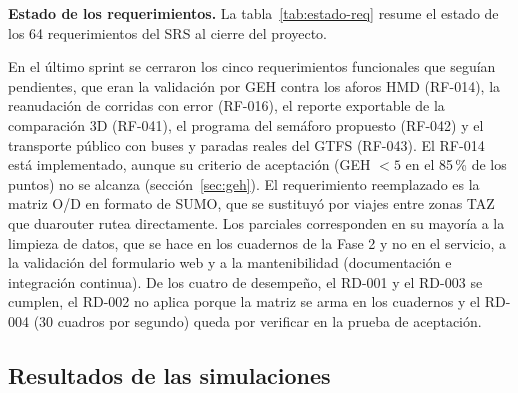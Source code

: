 \textbf{Estado de los requerimientos.} La tabla~\ref{tab:estado-req} resume el estado de los 64 requerimientos del SRS al cierre del proyecto.

\begin{table}[ht]
\renewcommand{\arraystretch}{1.15}
\centering
\small
{}
\caption{Estado de los requerimientos del SRS.}
\label{tab:estado-req}
\end{table}

En el último sprint se cerraron los cinco requerimientos funcionales que seguían pendientes, que eran la validación por GEH contra los aforos HMD (RF-014), la reanudación de corridas con error (RF-016), el reporte exportable de la comparación 3D (RF-041), el programa del semáforo propuesto (RF-042) y el transporte público con buses y paradas reales del GTFS (RF-043). El RF-014 está implementado, aunque su criterio de aceptación (GEH $<5$ en el 85\,\% de los puntos) no se alcanza (sección~\ref{sec:geh}). El requerimiento reemplazado es la matriz O/D en formato de SUMO, que se sustituyó por viajes entre zonas TAZ que duarouter rutea directamente. Los parciales corresponden en su mayoría a la limpieza de datos, que se hace en los cuadernos de la Fase 2 y no en el servicio, a la validación del formulario web y a la mantenibilidad (documentación e integración continua). De los cuatro de desempeño, el RD-001 y el RD-003 se cumplen, el RD-002 no aplica porque la matriz se arma en los cuadernos y el RD-004 (30 cuadros por segundo) queda por verificar en la prueba de aceptación.

\subsection{Resultados de las simulaciones}

